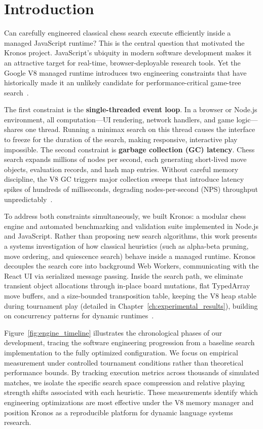 \chapter{Introduction}
\label{ch:introduction}

Can carefully engineered classical chess search execute efficiently inside a managed JavaScript runtime? This is the central question that motivated the Kronos project. JavaScript's ubiquity in modern software development makes it an attractive target for real-time, browser-deployable research tools. Yet the Google V8 managed runtime introduces two engineering constraints that have historically made it an unlikely candidate for performance-critical game-tree search~\cite{richards2010analysis, selakovic2016empirical}.

The first constraint is the \textbf{single-threaded event loop}. In a browser or Node.js environment, all computation—UI rendering, network handlers, and game logic—shares one thread. Running a minimax search on this thread causes the interface to freeze for the duration of the search, making responsive, interactive play impossible. The second constraint is \textbf{garbage collection (GC) latency}. Chess search expands millions of nodes per second, each generating short-lived move objects, evaluation records, and hash map entries. Without careful memory discipline, the V8 GC triggers major collection sweeps that introduce latency spikes of hundreds of milliseconds, degrading nodes-per-second (NPS) throughput unpredictably~\cite{jones2011garbage}.

To address both constraints simultaneously, we built Kronos: a modular chess engine and automated benchmarking and validation suite implemented in Node.js and JavaScript. Rather than proposing new search algorithms, this work presents a systems investigation of how classical heuristics (such as alpha-beta pruning, move ordering, and quiescence search) behave inside a managed runtime. Kronos decouples the search core into background Web Workers, communicating with the React UI via serialized message passing. Inside the search path, we eliminate transient object allocations through in-place board mutations, flat TypedArray move buffers, and a size-bounded transposition table, keeping the V8 heap stable during tournament play (detailed in Chapter~\ref{ch:experimental_results}), building on concurrency patterns for dynamic runtimes~\cite{hunter2021multithreaded}.



Figure~\ref{fig:engine_timeline} illustrates the chronological phases of our development, tracing the software engineering progression from a baseline search implementation to the fully optimized configuration. We focus on empirical measurement under controlled tournament conditions rather than theoretical performance bounds. By tracking execution metrics across thousands of simulated matches, we isolate the specific search space compression and relative playing strength shifts associated with each heuristic. These measurements identify which engineering optimizations are most effective under the V8 memory manager and position Kronos as a reproducible platform for dynamic language systems research.

